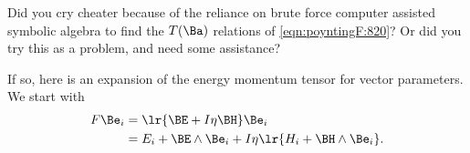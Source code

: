 %
%
\label{chap:stressTensorAlgebraically}
Did you cry cheater because of the reliance on brute force computer assisted symbolic algebra to find the \( T(\Ba) \) relations of \cref{eqn:poyntingF:820}?
Or did you try this as a problem, and need some assistance?

If so, here is an expansion of the energy momentum tensor for vector parameters.  We start with
\begin{equation}\label{eqn:stressTensorAlgebraically:1120}
\begin{aligned}
F \Be_i
&= \lr{ \BE + I \eta \BH } \Be_i \\
&= E_i + \BE \wedge \Be_i + I \eta \lr{ H_i + \BH \wedge \Be_i }.
\end{aligned}
\end{equation}

